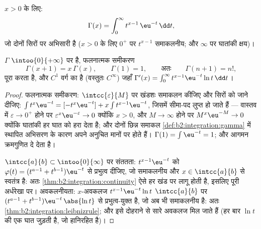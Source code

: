 \begin{definition}\label{def:b2:integration:gamma}
$x > 0$ के लिए:
\[
\Gamma(x) = \int_0^{\infty} t^{x-1}\,\eu^{-t}\,\dd t ,
\]
जो दोनों सिरों पर अभिसारी है ($x > 0$ के लिए $0^+$ पर $t^{x-1}$ समाकलनीय; और $\infty$ पर
घातांकी क्षय)।
\end{definition}

\begin{theorem}\label{thm:b2:integration:gammaprops}
$\Gamma$ $\intoo{0}{+\infty}$ पर  है, फलनात्मक समीकरण
\[
\Gamma(x + 1) = x\,\Gamma(x),
\qquad \Gamma(1) = 1,
\qquad\text{अतः}\qquad \Gamma(n + 1) = n! ,
\]
पूरा करता है, और $C^1$ वर्ग का है (वस्तुतः $C^\infty$) जहाँ $\Gamma'(x) =
\int_0^\infty t^{x-1}\eu^{-t}\ln t\,\dd t$।
\end{theorem}

\begin{proof}
फलनात्मक समीकरण: $\intcc{\varepsilon}{M}$ पर खंडशः समाकलन कीजिए और सिरों को जाने दीजिए: $\int t^{x}\eu^{-t} = [-t^x\eu^{-t}] + x\int
t^{x-1}\eu^{-t}$,
जिसमें सीमा-पद लुप्त हो जाते हैं --- वास्तव में $\varepsilon \to
0^+$ होने पर $\varepsilon^x\eu^{-\varepsilon} \to 0$ क्योंकि
$x > 0$, और $M \to \infty$ होने पर $M^x\eu^{-M} \to 0$ क्योंकि घातांकी हर घात को हरा देता है; और दोनों
छिन्न समाकल \cref{def:b2:integration:gamma} में स्थापित अभिसरण के कारण अपने अनुचित मानों पर 
होते हैं। $\Gamma(1) = \int
\eu^{-t} = 1$; और आगमन क्रमगुणित दे देता है।

$\intcc{a}{b} \subset \intoo{0}{\infty}$ पर संततता: $t^{x-1}\eu^{-t}$ को $\varphi(t) = (t^{a-1} + t^{b-1})\eu^{-t}$ से प्रभुत्व दीजिए, जो समाकलनीय और $x \in \intcc{a}{b}$ से
स्वतंत्र है: अतः \cref{thm:b2:integration:continuity} ऐसे हर खंड पर लागू होती है, इसलिए पूरी अर्धरेखा पर।
अवकलनीयता: $x$-अवकलज $t^{x-1}\eu^{-t}\ln t$ $\intcc{a}{b}$ पर $(t^{a-1}
+ t^{b-1})\eu^{-t}\,\abs{\ln t}$ से प्रभुत्व-युक्त है, जो अब भी
समाकलनीय है: अतः \cref{thm:b2:integration:leibnizrule}; और इसे दोहराने से सारे अवकलज मिल जाते हैं (हर बार
$\ln t$ की एक घात जुड़ती है, जो हानिरहित है)।
\end{proof}

